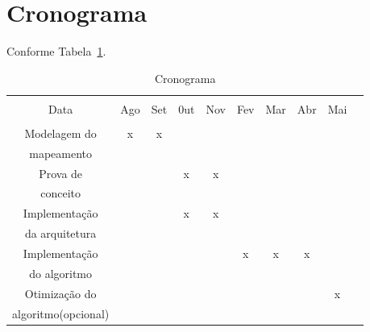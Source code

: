 \section{Cronograma}

Conforme Tabela~\ref{tab:crono}.
\begin{table}[Ht!]
   \begin{center}
     \begin{tabular}{|c|c|c|c|c|c|c|c|c|c|}
       \hline
                         &      &     &     &     &     &     &     &         \\
           Data          &  Ago & Set & 0ut & Nov & Fev & Mar & Abr & Mai      \\
                         &      &     &     &     &     &     &     &         \\
       \hline                                                                 
       Modelagem do      &   x  &  x  &     &     &     &     &     &         \\
       mapeamento        &      &     &     &     &     &     &     &         \\
       \hline                                                                 
       Prova de          &      &     &  x  &  x  &     &     &     &         \\
       conceito          &      &     &     &     &     &     &     &         \\
       \hline                                                                 
       Implementação     &      &     &  x  &  x  &     &     &     &         \\
       da arquitetura    &      &     &     &     &     &     &     &         \\
       \hline                                                                 
       Implementação     &      &     &     &     &  x  &  x  &  x  &         \\
       do algoritmo      &      &     &     &     &     &     &     &         \\
       \hline                                                                 
       Otimização do     &      &     &     &     &     &     &     &   x     \\
       algoritmo(opcional)&      &     &     &     &     &     &     &         \\
       \hline
     \end{tabular}
   \caption{Cronograma}
   \label{tab:crono}
   \end{center}
 \end{table}
